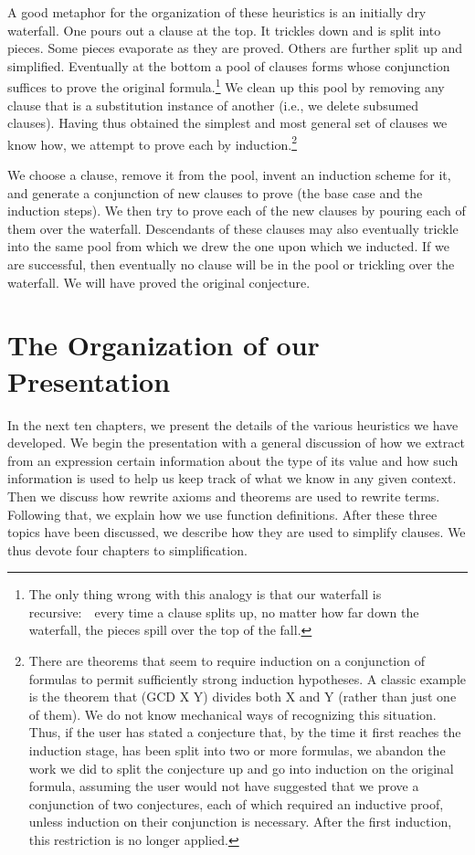 \documentclass[10pt]{book}
\begin{document}
A good  metaphor for the organization of these heuristics is
an initially dry waterfall.  One pours out a clause at the top.
It trickles down and is split into pieces.  Some pieces evaporate as
they are proved.  Others are further split up and simplified.  Eventually
at the bottom a pool of clauses forms whose
conjunction suffices to prove the original formula.\footnote{The only thing wrong with this analogy is that our waterfall is recursive:~~every time a clause splits up, no matter how far down the waterfall, the pieces spill over the top of the fall.}
We clean up this pool by removing any
clause that is a substitution instance of another (i.e.,
we delete subsumed clauses).
Having thus obtained the simplest and most
general set of clauses we know how, we attempt to prove
each  by induction.\footnote{There are theorems that seem to require induction on a conjunction of formulas to permit sufficiently strong induction hypotheses.  A classic example is the theorem that (GCD X Y) divides both X and Y (rather than just one of them).  We do not know mechanical ways of recognizing this situation.  Thus, if the user has stated a conjecture that, by the time it first reaches the induction stage, has been split into two or more formulas, we abandon the work we did to split the conjecture up and go into induction on the original formula, assuming the user would not have suggested that we prove a conjunction of two conjectures, each of which required an inductive proof, unless induction on their conjunction is necessary.  After the first induction, this restriction is no longer applied.}

We choose a clause, remove it from the pool,
invent an induction scheme for it,
and generate a conjunction of new clauses to prove (the base case
and the  induction steps).
We then try to prove each of the new  clauses by pouring each of them
over the waterfall.  Descendants of these clauses may
also eventually trickle into the 
same pool from which we drew the one upon which
we inducted.  If we are successful, then eventually no
clause will be in the pool or trickling over the waterfall.
We will have proved the original conjecture.

\section{The Organization of our Presentation}
In the next ten chapters, we  present the details of the
various heuristics we have developed.
We begin the presentation with a general discussion of how we extract
from an expression certain information about the type of its value and how
such information is used to help us keep track of what we know
in any given context.
Then we discuss how rewrite axioms and theorems are used to
rewrite terms.  Following that, we explain how we use
function definitions.  After these three topics have been discussed,
we  describe how they are used to simplify clauses.
We thus devote four chapters to simplification.
\end{document}
